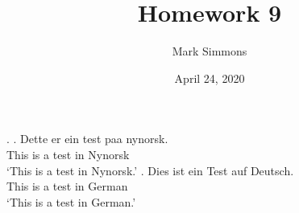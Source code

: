 \documentclass[a4paper, 11pt]{article}
\title{Homework 9}
\author{Mark Simmons}
\date{April 24, 2020}
\begin{document}
\ex.
  \ag.
    Dette er ein test paa nynorsk.\\
    This is a test in Nynorsk\\
    \trans `This is a test in Nynorsk.'
  \bg.
    Dies ist ein Test auf Deutsch.\\
    This is a test in German\\
    \trans `This is a test in German.'
\end{document}
